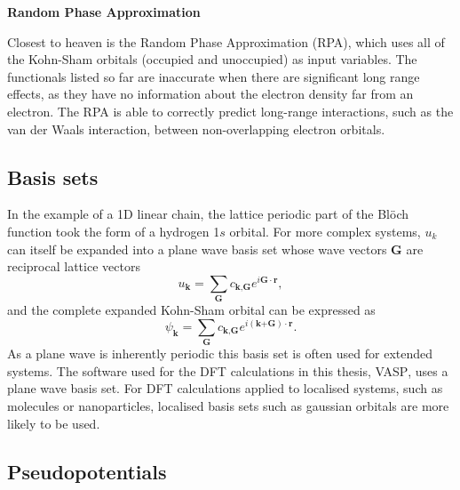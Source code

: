  
\textbf{Random Phase Approximation} 

Closest to heaven is the Random Phase Approximation (RPA), which uses all of the Kohn-Sham orbitals (occupied and unoccupied) as input variables. The functionals listed so far are inaccurate when there are significant long range effects, as they have no information about the electron density far from an electron. The RPA is able to correctly predict long-range interactions, such as the van der Waals interaction, between non-overlapping electron orbitals.

\subsection{Basis sets}



In the example of a 1D linear chain, the lattice periodic part of the Bl\"{o}ch function took the form of a hydrogen 1$s$ orbital. For more complex systems, $u_k$ can itself be expanded into a plane wave basis set whose wave vectors $\textbf{G}$ are reciprocal lattice vectors
\begin{equation}
u_\textbf{k} = \sum_\textbf{G}c_{\textbf{k},\textbf{G}}e^{i\textbf{G}\cdot\textbf{r}},
\end{equation}
and the complete expanded Kohn-Sham orbital can be expressed as
\begin{equation} \label{KSeigenstates}
\psi_\textbf{k} = \sum_\textbf{G}c_{\textbf{k},\textbf{G}}e^{i(\textbf{k+G})\cdot\textbf{r}}.
\end{equation}
As a plane wave is inherently periodic this basis set is often used for extended systems. The software used for the DFT calculations in this thesis, \textsc{VASP}\autocite{Kresse1996}, uses a plane wave basis set. For DFT calculations applied to localised systems, such as molecules or nanoparticles, localised basis sets such as gaussian orbitals are more likely to be used.

\subsection{Pseudopotentials}

